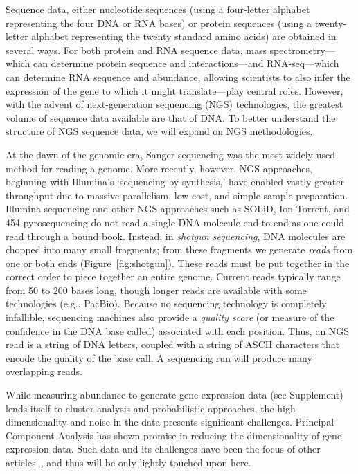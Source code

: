 \documentclass{acm_proc_article-sp}
\begin{document}
Sequence data, either 
nucleotide sequences (using a four-letter alphabet representing the four
DNA or RNA bases) or protein sequences (using a twenty-letter alphabet 
representing the twenty standard amino acids)
are obtained in several ways.
For both protein and RNA sequence data, mass spectrometry---which
can determine protein sequence and interactions---and RNA-seq---which can determine RNA sequence and abundance, 
allowing scientists to also infer the expression of the gene to which it might translate---play central roles.
However, with the advent of next-generation sequencing (NGS) technologies, the greatest volume of sequence data available are that of DNA.
To better understand the structure of NGS sequence data, we will expand on NGS methodologies.

At the dawn of the genomic era, Sanger sequencing was the most widely-used 
method for reading a genome.
More recently, however, NGS approaches,
beginning with Illumina's `sequencing by synthesis,' have enabled vastly 
greater throughput due to massive parallelism, low cost, and simple sample
preparation.
Illumina sequencing and other NGS approaches
such as SOLiD, Ion Torrent, and 454 pyrosequencing do not read a single DNA
molecule end-to-end as one could read through a bound book.
Instead, in \emph{shotgun sequencing}, DNA molecules are chopped into many small fragments;
from these fragments we generate 
\emph{reads} from one or both ends (Figure~\ref{fig:shotgun}).
These reads must be put together in the correct order 
to piece together an entire genome.
Current reads typically range from 50 to 200 bases long, though longer reads are
available with some technologies (e.g., PacBio).
Because no sequencing technology is completely infallible, sequencing machines also
provide a \emph{quality score} (or measure of the confidence in the DNA base
called) associated with each position.
Thus, an NGS read is a string of DNA letters, coupled with a string of ASCII
characters that encode the quality of the base call.
A sequencing run will produce many overlapping reads.

While measuring abundance to generate gene expression data (see Supplement) lends itself to cluster analysis 
and probabilistic 
approaches, the high dimensionality and noise in the data presents significant 
challenges.
Principal Component Analysis has shown promise in reducing the dimensionality
of gene expression 
data.
Such data and its challenges have been the focus of other 
articles~\cite{berger2013computational}, and thus will be only lightly touched 
upon here.
\end{document}
